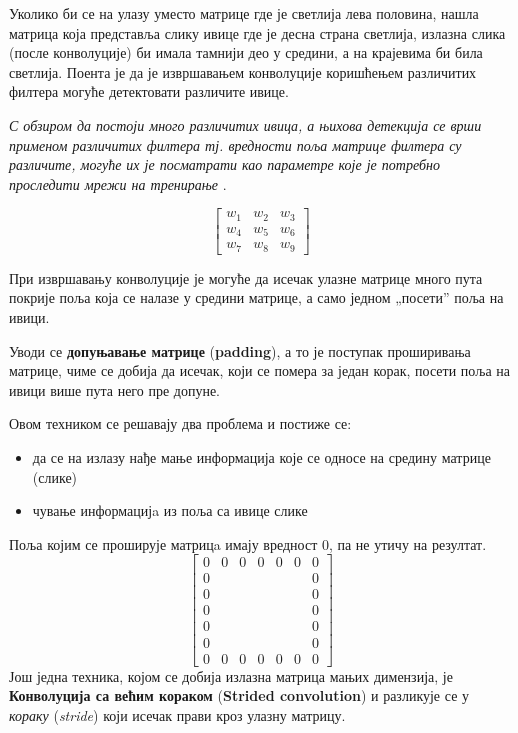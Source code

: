 \documentclass[12pt, а4paper]{article}
\begin{document}
Уколико би се на улазу уместо матрице где је светлија лева половина, 
нашла матрица која представља слику ивице где је десна страна светлија, излазна
слика (после конволуције) би имала тамнији део у средини, а на крајевима
би била светлија.
\newpage
Поента је да је извршавањем конволуције коришћењем различитих филтера могуће
детектовати различите ивице.

\textit{С обзиром да постоји много различитих ивица, а њихова детекција се врши
применом различитих филтера тј. вредности поља матрице филтера су различите,
могуће их је посматрати као параметре које је потребно
проследити мрежи на тренирање} \cite{ngMoreEdge}.

\begin{equation}
\begin{bmatrix}
 w_1 & w_2 & w_3 \\
 w_4 & w_5 & w_6 \\
 w_7 & w_8 & w_9
\end{bmatrix}
\label{eq:KonvMatrica}
\end{equation}

При извршавању конволуције је могуће да исечак улазне матрице много пута
покрије поља која се налазе у средини матрице, а само једном „посети” поља
на ивици.

Уводи се \textbf{допуњавање матрице} (\textbf{padding}), а то је поступак
проширивања матрице, чиме се добија да исечак, који се помера за један
корак, посети поља на ивици више пута него пре допуне.

Овом техником се решавају два проблема и постиже се:
\begin{itemize}
 \item да се на излазу нађе мање информација које се односе на средину матрице (слике)
 \item чување информацијa из поља са ивице слике
\end{itemize}

Поља којим се проширује матрицa имају вредност 0, па не утичу на резултат.
\begin{equation}
\begin{bmatrix}
 0 & 0 & 0 & 0 & 0 & 0 & 0 \\
 0 &   &   &   &   &   & 0 \\
 0 &   &   &   &   &   & 0 \\
 0 &   &   &   &   &   & 0 \\
 0 &   &   &   &   &   & 0 \\
 0 &   &   &   &   &   & 0 \\
 0 & 0 & 0 & 0 & 0 & 0 & 0
\end{bmatrix}
\label{eq:KonvMatricaPadd}
\end{equation}
\newpage
Још једна техника, којом се добија излазна матрица мањих димензија, је
\textbf{Конволуција са већим кораком} (\textbf{Strided convolution}) и
разликује се у \textit{кораку} (\textit{stride}) који исечак прави
кроз улазну матрицу.
\end{document}

